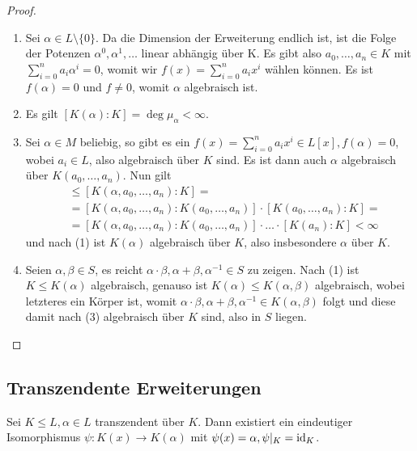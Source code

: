 \begin{proof}{\ }
    \begin{enumerate}
        \item Sei $\alpha \in L \setminus \{0\}$. Da die Dimension der Erweiterung endlich ist, ist die Folge der Potenzen $\alpha^0, \alpha^1, \hdots$ linear abhängig über K. Es gibt also $a_0, \hdots, a_n \in K$ mit $\sum_{i=0}^n a_i \alpha^i = 0$, womit wir $f(x) = \sum_{i=0}^n a_i x^i$ wählen können. Es ist $f(\alpha) = 0$ und $f\neq 0$, womit $\alpha$ algebraisch ist.
        
        \item Es gilt $[K(\alpha) : K] = \deg \mu_\alpha < \infty$.
        
        \item Sei $\alpha \in M$ beliebig, so gibt es ein $f(x) = \sum_{i=0}^n a_i x^i \in L[x], f(\alpha) = 0$, wobei $a_i \in L$, also algebraisch über $K$ sind. Es ist dann auch $\alpha$ algebraisch über $K(a_0, \hdots, a_n)$. Nun gilt
        \begin{align*}
            [K(\alpha) : K] &\leq [K(\alpha, a_0, \hdots, a_n) : K] = \\
            &= [K(\alpha, a_0, \hdots, a_n) : K(a_0, \hdots, a_n)] \cdot [K(a_0, \hdots, a_n) : K] = \\
            &= [K(\alpha, a_0, \hdots, a_n) : K(a_0, \hdots, a_n)] \cdot \hdots \cdot [K(a_n) : K] < \infty
        \end{align*}
        und nach (1) ist $K(\alpha)$ algebraisch über $K$, also insbesondere $\alpha$ über $K$.

        \item Seien $\alpha, \beta \in S$, es reicht $\alpha\cdot\beta,\alpha+\beta,\alpha^{-1}\in S$ zu zeigen. Nach (1) ist $K \leq K(\alpha)$ algebraisch, genauso ist $K(\alpha) \leq K(\alpha, \beta)$ algebraisch, wobei letzteres ein Körper ist, womit $\alpha \cdot \beta, \alpha + \beta, \alpha^{-1} \in K(\alpha, \beta)$ folgt und diese damit nach (3) algebraisch über $K$ sind, also in $S$ liegen.
    \end{enumerate}
\end{proof}

\subsection{Transzendente Erweiterungen}

\begin{proposition}
    Sei $K \leq L, \alpha \in L$ transzendent über $K$. Dann existiert ein eindeutiger Isomorphismus $\psi : K(x) \to K(\alpha)$ mit $\psi(x) = \alpha, \psi \vert_K = \operatorname{id}_K$.
\end{proposition}

